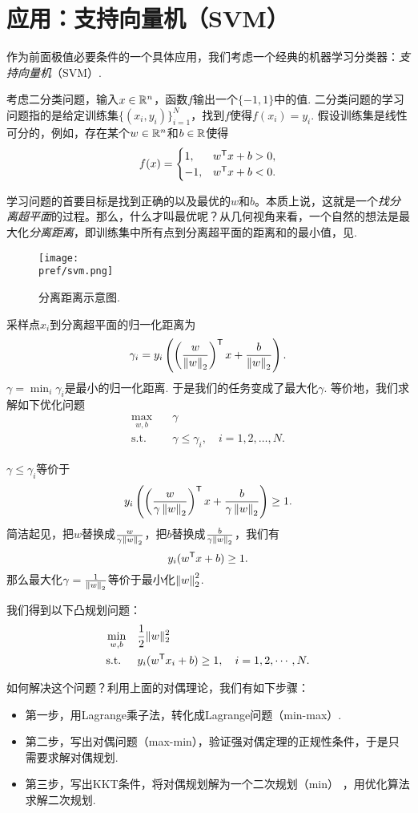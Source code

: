 \section{应用：支持向量机（SVM）}

作为前面极值必要条件的一个具体应用，我们考虑一个经典的机器学习分类器：\emph{支持向量机}（SVM）. 

考虑二分类问题，输入$x\in \mathbb{R}^n$，函数$f$输出一个$\{-1,1\}$中的值. 二分类问题的学习问题指的是给定训练集$\{(x_i,y_i)\}_{i=1}^N$，找到$f$使得$f(x_i)=y_i$. 假设训练集是线性可分的，例如，存在某个$w\in \mathbb{R}^n$和$b\in \mathbb{R}$使得
    $$f(x)=\begin{cases}
		1,& w^{\mathsf{T}} x+b>0,\\
		-1, &w^{\mathsf{T}} x+b<0.
	\end{cases}$$

学习问题的首要目标是找到正确的以及最优的$w$和$b$。本质上说，这就是一个\emph{找分离超平面}的过程。那么，什么才叫最优呢？从几何视角来看，一个自然的想法是最大化\emph{分离距离}，即训练集中所有点到分离超平面的距离和的最小值，见.
\begin{figure}
    \centering
    \texttt{[image: \\pref/svm.png]}
    \caption{分离距离示意图.}
    \label{fig:svm}
\end{figure}

采样点$x_i$到分离超平面的归一化距离为
    $$\gamma_i=y_i\left(\left(\frac{w}{\left\|w\right\|_2}\right)^{\mathsf{T}} x+\frac{b}{\left\|w\right\|_2}\right).$$
$\gamma=\min_i\gamma_i$是最小的归一化距离. 于是我们的任务变成了最大化$\gamma$. 等价地，我们求解如下优化问题
\begin{align*}
    \max_{w,b}\quad&\gamma \\
    \text{s.t.}\quad&\gamma\le\gamma_i,\quad i=1,2,\dots,N.
\end{align*}

$\gamma\le\gamma_i$等价于$$y_i\left(\left(\frac{w}{\gamma\left\|w\right\|_2}\right)^{\mathsf{T}} x+\frac{b}{\gamma\left\|w\right\|_2}\right)\geq 1.$$
简洁起见，把$w$替换成$\frac{w}{\gamma\left\|w\right\|_2}$，把$b$替换成$\frac{b}{\gamma\left\|w\right\|_2}$，我们有$$y_i(w^{\mathsf{T}} x+b)\geq 1.$$
那么最大化$\gamma=\frac{1}{\left\|w\right\|_2}$等价于最小化$\left\|w\right\|_2^2$. 

我们得到以下凸规划问题：
\begin{align*}
    \min_{w,b}\quad&\frac{1}{2}\|w\|_2^2\\
    \text{s.t. }\quad &y_i(w^{\mathsf{T}} x_i+b)\geq 1,\quad i=1,2,\cdots, N.
\end{align*}

如何解决这个问题？利用上面的对偶理论，我们有如下步骤：
\begin{itemize}
    \item 第一步，用Lagrange乘子法，转化成Lagrange问题（min-max）.
    \item 第二步，写出对偶问题（max-min），验证强对偶定理的正规性条件，于是只需要求解对偶规划.
    \item 第三步，写出KKT条件，将对偶规划解为一个二次规划（min） ，用优化算法求解二次规划.
\end{itemize}

\endgroup